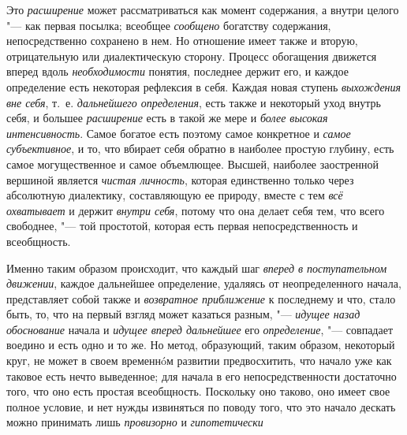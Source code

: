 {{Это {\em расширение} может рассматриваться как момент содержания, а внутри
целого "--- как первая посылка; всеобщее {\em сообщено} богатству
содержания, непосредственно сохранено в нем. Но отношение имеет также и
вторую, отрицательную или диалектическую сторону. Процесс обогащения
движется вперед вдоль {\em необходимости}
понятия, последнее держит его, и каждое определение есть
некоторая рефлексия в себя. Каждая новая ступень
{\em выхождения вне себя}, т.~е. {\em дальнейшего
определения}, есть также и некоторый уход внутрь себя, и
большее {\em расширение} есть в такой же мере и
{\em более высокая интенсивность}.
Самое богатое есть поэтому самое конкретное и {\em самое субъективное},
и то, что вбирает себя обратно в наиболее простую глубину,
есть самое могущественное и самое объемлющее. Высшей, наиболее заостренной
вершиной является {\em чистая
личность}, которая единственно только через абсолютную
диалектику, составляющую ее природу, вместе с тем
{\em всё охватывает} и держит {\em внутри себя},
потому что она делает себя тем, что всего свободнее, "---
той простотой, которая есть первая непосредственность и всеобщность.

Именно таким образом происходит, что каждый шаг {\em вперед в поступательном
движении}, каждое дальнейшее определение, удаляясь от неопределенного начала,
представляет собой также и {\em возвратное приближение}
к последнему и что,
стало быть, то, что на первый взгляд может казаться разным, "--- {\em идущее
назад обоснование} начала и {\em идущее вперед дальнейшее} его {\em
определение}, "--- совпадает воедино и есть одно и то же. Но метод, образующий,
таким образом, некоторый круг, не может в своем временнóм развитии
предвосхитить, что начало уже как таковое есть нечто выведенное; для начала
в его непосредственности достаточно того, что оно есть простая всеобщность.
Поскольку оно таково, оно имеет свое полное условие, и нет нужды извиняться
по поводу того, что это начало дескать можно принимать лишь {\em провизорно}
и {\em гипотетически}}}

